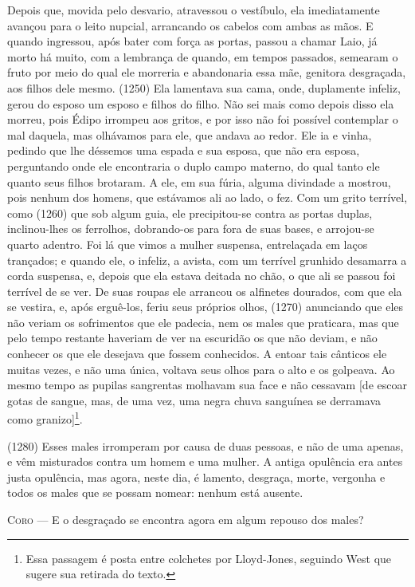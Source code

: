 Depois que, movida pelo desvario, atravessou o vestíbulo, ela
imediatamente avançou para o leito nupcial, arrancando os cabelos com
ambas as mãos. E quando ingressou, após bater com força as portas,
passou a chamar Laio, já morto há muito, com a lembrança de quando, em
tempos passados, semearam o fruto por meio do qual ele morreria e
abandonaria essa mãe, genitora desgraçada, aos filhos dele mesmo. (1250)
Ela lamentava sua cama, onde, duplamente infeliz, gerou do esposo um
esposo e filhos do filho. Não sei mais como depois disso ela morreu,
pois Édipo irrompeu aos gritos, e por isso não foi possível contemplar o
mal daquela, mas olhávamos para ele, que andava ao redor. Ele ia e
vinha, pedindo que lhe déssemos uma espada e sua esposa, que não era
esposa, perguntando onde ele encontraria o duplo campo materno, do qual
tanto ele quanto seus filhos brotaram. A ele, em sua fúria, alguma
divindade a mostrou, pois nenhum dos homens, que estávamos ali ao lado,
o fez. Com um grito terrível, como (1260) que sob algum guia, ele
precipitou-se contra as portas duplas, inclinou-lhes os ferrolhos,
dobrando-os para fora de suas bases, e arrojou-se quarto adentro. Foi lá
que vimos a mulher suspensa, entrelaçada em laços trançados; e quando
ele, o infeliz, a avista, com um terrível grunhido desamarra a corda
suspensa, e, depois que ela estava deitada no chão, o que ali se passou
foi terrível de se ver. De suas roupas ele arrancou os alfinetes
dourados, com que ela se vestira, e, após erguê-los, feriu seus próprios
olhos, (1270) anunciando que eles não veriam os sofrimentos que ele
padecia, nem os males que praticara, mas que pelo tempo restante
haveriam de ver na escuridão os que não deviam, e não conhecer os que
ele desejava que fossem conhecidos. A entoar tais cânticos ele muitas
vezes, e não uma única, voltava seus olhos para o alto e os golpeava. Ao
mesmo tempo as pupilas sangrentas molhavam sua face e não cessavam {[}de
escoar gotas de sangue, mas, de uma vez, uma negra chuva sanguínea se
derramava como granizo{]}\footnote{Essa passagem é posta entre colchetes
  por Lloyd-Jones, seguindo West que sugere sua retirada do texto.}.

(1280) Esses males irromperam por causa de duas pessoas, e não de uma
apenas, e vêm misturados contra um homem e uma mulher. A antiga
opulência era antes justa opulência, mas agora, neste dia, é lamento,
desgraça, morte, vergonha e todos os males que se possam nomear: nenhum
está ausente.

\textsc{Coro} --- E o desgraçado se encontra agora em algum repouso dos males?

